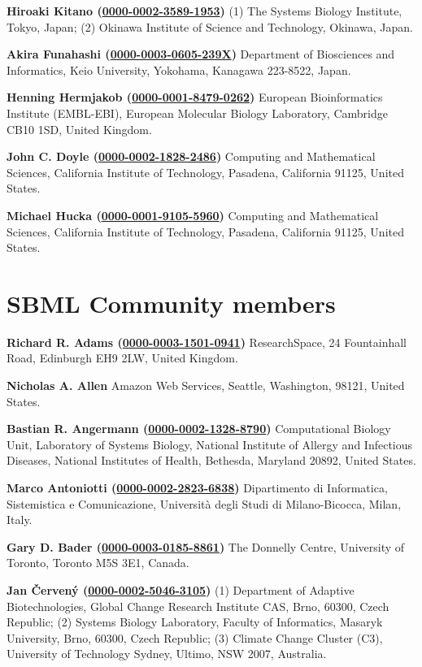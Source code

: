 \documentclass{sbml-paper}
\newcommand{\orcid}[1]{\href{https://orcid.org/#1}{#1}}
\begin{document}
\textbf{Hiroaki Kitano (\orcid{0000-0002-3589-1953})} (1) The Systems Biology Institute, Tokyo, Japan; (2) Okinawa Institute of Science and Technology, Okinawa, Japan.

\textbf{Akira Funahashi (\orcid{0000-0003-0605-239X})} Department of Biosciences and Informatics, Keio University, Yokohama, Kanagawa 223-8522, Japan.

\textbf{Henning Hermjakob (\orcid{0000-0001-8479-0262})} European Bioinformatics Institute (EMBL-EBI), European Molecular Biology Laboratory, Cambridge CB10 1SD, United Kingdom.

\textbf{John C. Doyle (\orcid{0000-0002-1828-2486})} Computing and Mathematical Sciences, California Institute of Technology, Pasadena, California 91125, United States.

\textbf{Michael Hucka (\orcid{0000-0001-9105-5960})} Computing and Mathematical Sciences, California Institute of Technology, Pasadena, California 91125, United States.


\section*{SBML Community members}

\textbf{Richard R. Adams (\orcid{0000-0003-1501-0941})} ResearchSpace, 24 Fountainhall Road, Edinburgh EH9 2LW, United Kingdom.

\textbf{Nicholas A. Allen} Amazon Web Services, Seattle, Washington, 98121, United States.

\textbf{Bastian R. Angermann (\orcid{0000-0002-1328-8790})} Computational Biology Unit, Laboratory of Systems Biology, National Institute of Allergy and Infectious Diseases, National Institutes of Health, Bethesda, Maryland 20892, United States.

\textbf{Marco Antoniotti (\orcid{0000-0002-2823-6838})} Dipartimento di Informatica, Sistemistica e Comunicazione, Università degli Studi di Milano-Bicocca, Milan, Italy.

\textbf{Gary D. Bader (\orcid{0000-0003-0185-8861})} The Donnelly Centre, University of Toronto, Toronto M5S 3E1, Canada.

\textbf{Jan Červený (\orcid{0000-0002-5046-3105})} (1) Department of Adaptive Biotechnologies, Global Change Research Institute CAS, Brno, 60300, Czech Republic; (2) Systems Biology Laboratory, Faculty of Informatics, Masaryk University, Brno, 60300, Czech Republic; (3) Climate Change Cluster (C3), University of Technology Sydney, Ultimo, NSW 2007, Australia.
\end{document}
